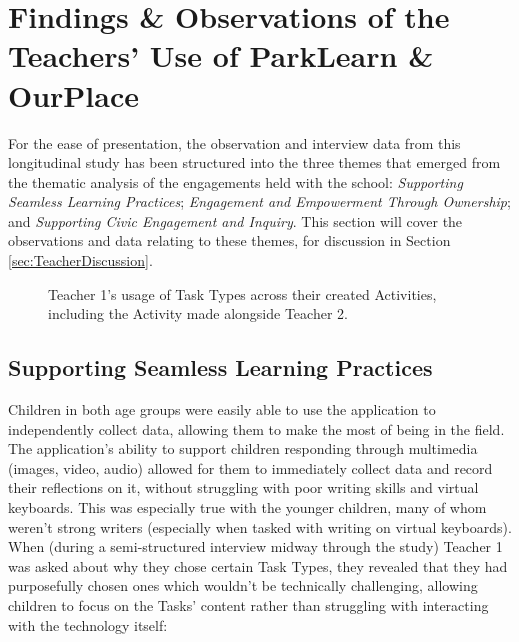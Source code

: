 \section{Findings \& Observations of the Teachers' Use of ParkLearn \& OurPlace}

For the ease of presentation, the observation and interview data from this longitudinal study has been structured into the three themes that emerged from the thematic analysis of the engagements held with the school: \textit{Supporting Seamless Learning Practices}; \textit{Engagement and Empowerment Through Ownership}; and \textit{Supporting Civic Engagement and Inquiry}. This section will cover the observations and data relating to these themes, for discussion in Section \ref{sec:TeacherDiscussion}.

\begin{figure}
    \centering
    \caption[Teacher 1's usage of Task Types across their created Activities]{Teacher 1's usage of Task Types across their created Activities, including the Activity made alongside Teacher 2.}
    \label{fig:TaskTypeUsage}
\end{figure}

\subsection{Supporting Seamless Learning Practices}

Children in both age groups were easily able to use the application to independently collect data, allowing them to make the most of being in the field. The application's ability to support children responding through multimedia (images, video, audio) allowed for them to immediately collect data and record their reflections on it, without struggling with poor writing skills and virtual keyboards. This was especially true with the younger children, many of whom weren't strong writers (especially when tasked with writing on virtual keyboards). When (during a semi-structured interview midway through the study) Teacher 1 was asked about why they chose certain Task Types, they revealed that they had purposefully chosen ones which wouldn't be technically challenging, allowing children to focus on the Tasks' content rather than struggling with interacting with the technology itself: 

